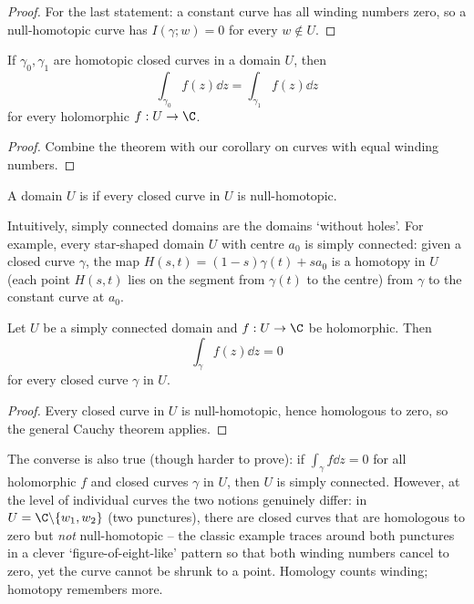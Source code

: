 \begin{proof}
    For the last statement: a constant curve has all winding numbers zero, so a null-homotopic curve has $I(\gamma; w) = 0$ for every $w \notin U$.
\end{proof}

\begin{corollary}
    If $\gamma_0, \gamma_1$ are homotopic closed curves in a domain $U$, then
    $$
    \int_{\gamma_0} f(z) \dd z = \int_{\gamma_1} f(z) \dd z
    $$
    for every holomorphic $f: U \rightarrow \C$.
\end{corollary}
\begin{proof}
    Combine the theorem with our corollary on curves with equal winding numbers.
\end{proof}

\begin{definition}
    A domain $U$ is  if every closed curve in $U$ is null-homotopic.
\end{definition}

Intuitively, simply connected domains are the domains `without holes'. For example, every star-shaped domain $U$ with centre $a_0$ is simply connected: given a closed curve $\gamma$, the map $H(s, t) = (1 - s)\gamma(t) + s a_0$ is a homotopy in $U$ (each point $H(s,t)$ lies on the segment from $\gamma(t)$ to the centre) from $\gamma$ to the constant curve at $a_0$.

\begin{theorem}
    Let $U$ be a simply connected domain and $f: U \rightarrow \C$ be holomorphic. Then
    $$
    \int_\gamma f(z) \dd z = 0
    $$
    for every closed curve $\gamma$ in $U$.
\end{theorem}
\begin{proof}
    Every closed curve in $U$ is null-homotopic, hence homologous to zero, so the general Cauchy theorem applies.
\end{proof}

\begin{remark}
    The converse is also true (though harder to prove): if $\int_\gamma f \dd z = 0$ for all holomorphic $f$ and closed curves $\gamma$ in $U$, then $U$ is simply connected. However, at the level of individual curves the two notions genuinely differ: in $U = \C \backslash \{w_1, w_2\}$ (two punctures), there are closed curves that are homologous to zero but \emph{not} null-homotopic -- the classic example traces around both punctures in a clever `figure-of-eight-like' pattern so that both winding numbers cancel to zero, yet the curve cannot be shrunk to a point. Homology counts winding; homotopy remembers more.
\end{remark}


